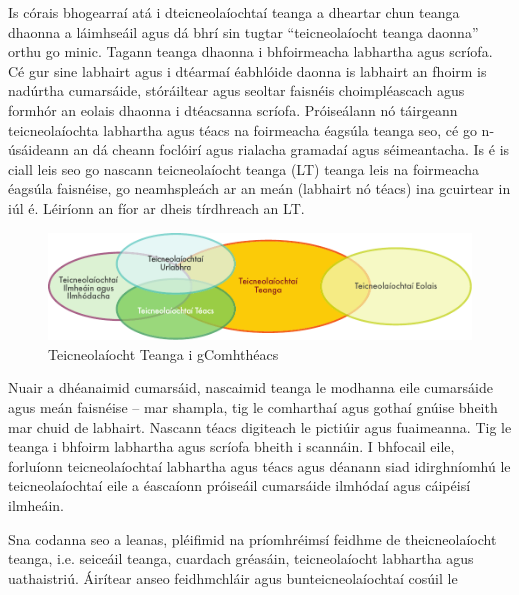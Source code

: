\documentclass[]{../../metanetpaper}
\begin{document}
\clearpage



\begin{multicols}{2}

Is córais bhogearraí atá i dteicneolaíochtaí teanga a dheartar chun teanga dhaonna a láimhseáil agus dá bhrí sin tugtar “teicneolaíocht teanga daonna” orthu go minic. Tagann teanga dhaonna i bhfoirmeacha labhartha agus scríofa. Cé gur sine labhairt agus i dtéarmaí éabhlóide daonna is labhairt an fhoirm is nadúrtha cumarsáide, stóráiltear agus seoltar faisnéis choimpléascach agus formhór an eolais dhaonna i dtéacsanna scríofa. Próiseálann nó táirgeann teicneolaíochta labhartha agus téacs na foirmeacha éagsúla teanga seo, cé go n-úsáideann an dá cheann foclóirí agus rialacha gramadaí agus séimeantacha. Is é is ciall leis seo go nascann teicneolaíocht teanga (LT) teanga leis na foirmeacha éagsúla faisnéise, go neamhspleách ar an meán (labhairt nó téacs) ina gcuirtear in iúl é. Léiríonn an fíor ar dheis tírdhreach an LT.

\begin{figure}[htb]
  \center
  \includegraphics[width=\textwidth]{../_media/irish/language_technologies}
  \caption{Teicneolaíocht Teanga i gComhthéacs}
  \label{fig:ltincontext_de}
\end{figure}

 Nuair a dhéanaimid cumarsáid, nascaimid teanga le modhanna eile cumarsáide agus meán faisnéise – mar shampla, tig le comharthaí agus gothaí gnúise bheith mar chuid de labhairt. Nascann téacs digiteach le pictiúir agus fuaimeanna. Tig le teanga i bhfoirm labhartha agus scríofa bheith i scannáin. I bhfocail eile, forluíonn teicneolaíochtaí labhartha agus téacs agus déanann siad idirghníomhú le teicneolaíochtaí eile a éascaíonn próiseáil cumarsáide ilmhódaí agus cáipéisí ilmheáin. 

Sna codanna seo a leanas, pléifimid na príomhréimsí feidhme de theicneolaíocht teanga, i.e. seiceáil teanga, cuardach gréasáin, teicneolaíocht labhartha agus uathaistriú. Áirítear anseo feidhmchláir agus bunteicneolaíochtaí cosúil le


\end{multicols}
\end{document}
